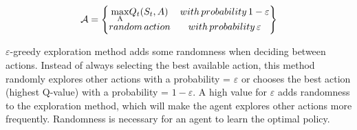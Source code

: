 {\setlength{\mathindent}{4cm}
\begin{equation}
    \begin{split}
       \mathcal{A} = \begin{Bmatrix}
            \underset{\rm A}{\rm max} Q_{t}(S_{t},A) & with \thinspace probability\thinspace 1-\varepsilon \\ 
            random\thinspace action & with\thinspace probability \thinspace \varepsilon
        \end{Bmatrix}
    \end{split}
    \label{equ:e-greedy}
\end{equation}
}

$\varepsilon$-greedy exploration method adds some randomness when deciding between actions. Instead of always selecting the best available action, this method randomly explores other actions with a probability = $\varepsilon$ or chooses the best action (highest Q-value) with a probability = $1-\varepsilon$. A high value for $\varepsilon$ adds randomness to the exploration method, which will make the agent explores other actions more frequently. Randomness is necessary for an agent to learn the optimal policy.